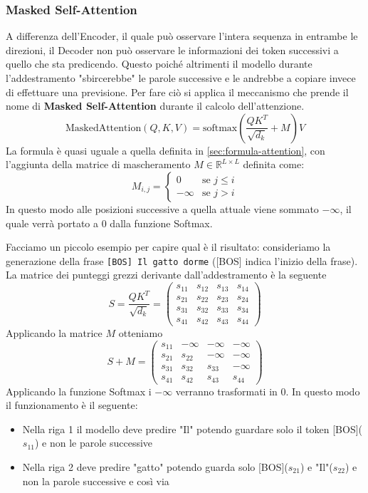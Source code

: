 \documentclass{article}
\begin{document}
\subsubsection{Masked Self-Attention}
\label{masked}
A differenza dell'Encoder, il quale può osservare l'intera sequenza in entrambe le direzioni, il Decoder non può osservare le informazioni dei token successivi a quello che sta predicendo.
Questo poiché altrimenti il modello durante l'addestramento "sbircerebbe" le parole successive e le andrebbe a copiare invece di effettuare una previsione.
Per fare ciò si applica il meccanismo che prende il nome di \textbf{Masked Self-Attention} durante il calcolo dell'attenzione.
$$\text{MaskedAttention}(Q, K, V) = \text{softmax}\left(\frac{Q K^T}{\sqrt{d_k}} + M\right) V$$
La formula è quasi uguale a quella definita in \ref{sec:formula-attention}, con l'aggiunta della matrice di mascheramento $M \in \mathbb{R}^{L \times L}$ definita come:
$$M_{i, j} = \begin{cases} 0 & \text{se } j \le i \\ -\infty & \text{se } j > i \end{cases}$$
In questo modo alle posizioni successive a quella attuale viene sommato $-\infty$, il quale verrà portato a 0 dalla funzione Softmax.

Facciamo un piccolo esempio per capire qual è il risultato:
consideriamo la generazione della frase \texttt{[BOS] Il gatto dorme} ([BOS] indica l'inizio della frase).
La matrice dei punteggi grezzi derivante dall'addestramento è la seguente
$$S = \frac{QK^T}{\sqrt{d_k}} =  \begin{pmatrix} s_{11} & s_{12} & s_{13} & s_{14} \\ s_{21} & s_{22} & s_{23} & s_{24} \\ s_{31} & s_{32} & s_{33} & s_{34} \\ s_{41} & s_{42} & s_{43} & s_{44} \end{pmatrix}$$
Applicando la matrice $M$ otteniamo
$$S + M =  \begin{pmatrix} s_{11} & -\infty & -\infty & -\infty \\ s_{21} & s_{22} & -\infty & -\infty \\ s_{31} & s_{32} & s_{33} & -\infty \\ s_{41} & s_{42} & s_{43} & s_{44} \end{pmatrix}$$
Applicando la funzione Softmax i $-\infty$ verranno trasformati in $0$.
In questo modo il funzionamento è il seguente:
\begin{itemize}
    \item Nella riga 1 il modello deve predire "Il" potendo guardare solo il token [BOS]($s_{11}$) e non le parole successive
    \item Nella riga 2 deve predire "gatto" potendo guarda solo [BOS]($s_{21}$) e "Il"($s_{22}$) e non la parole successive e così via
\end{itemize}
\end{document}
